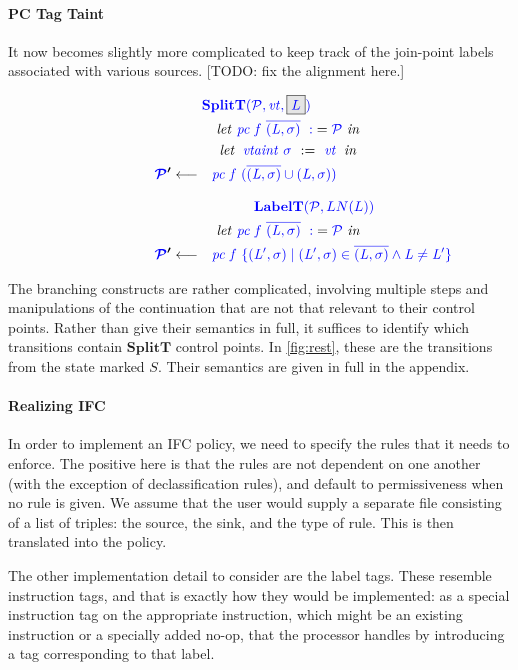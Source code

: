 \documentclass{llncs}
\begin{document}
\paragraph*{PC Tag Taint}

It now becomes slightly more complicated to keep track of the join-point labels
associated with various sources. [TODO: fix the alignment here.]

\begin{minipage}[t]{.25\textwidth}
\[\begin{aligned}
\truledef{\splitt}
\letin{\pctaint{f}{\overline{(L,\sigma)}} := \PCT}
\letin{\vtaint{\sigma} := \vt}
\settag{\PCT'}{\pctaint{f}{(\overline{(L,\sigma)} \cup (L,\sigma))}}
\end{aligned}\]
\end{minipage}
\begin{minipage}[t]{.7\textwidth}
\[\begin{aligned}
\truledef{\labelt}
\letin{\pctaint{f}{\overline{(L,\sigma)}} := \PCT}
\settag{\PCT'}{\pctaint{f}{\{(L',\sigma) \mid (L',\sigma) \in \overline{(L,\sigma)} \land L \not = L'\}}}
\end{aligned}\]
\end{minipage}

The branching constructs are rather complicated, involving multiple steps
and manipulations of the continuation that are not that relevant to their control
points. Rather than give their semantics in full, it suffices to identify which
transitions contain \(\mathbf{SplitT}\) control points. In \cref{fig:rest}, these
are the transitions from the state marked \(S\). Their semantics are given in full
in the appendix.

\paragraph*{Realizing IFC}

In order to implement an IFC policy, we need to specify the rules that it needs to enforce.
The positive here is that the rules are not dependent on one another (with the exception of
declassification rules), and default to permissiveness when no rule is given. We assume that
the user would supply a separate file consisting of a list of triples: the source, the sink,
and the type of rule. This is then translated into the policy.

The other implementation detail to consider are the label tags. These resemble
instruction tags, and that is exactly how they would be implemented: as a special instruction
tag on the appropriate instruction, which might be an existing instruction or a specially
added no-op, that the processor handles by introducing a tag corresponding to that label.
\end{document}
